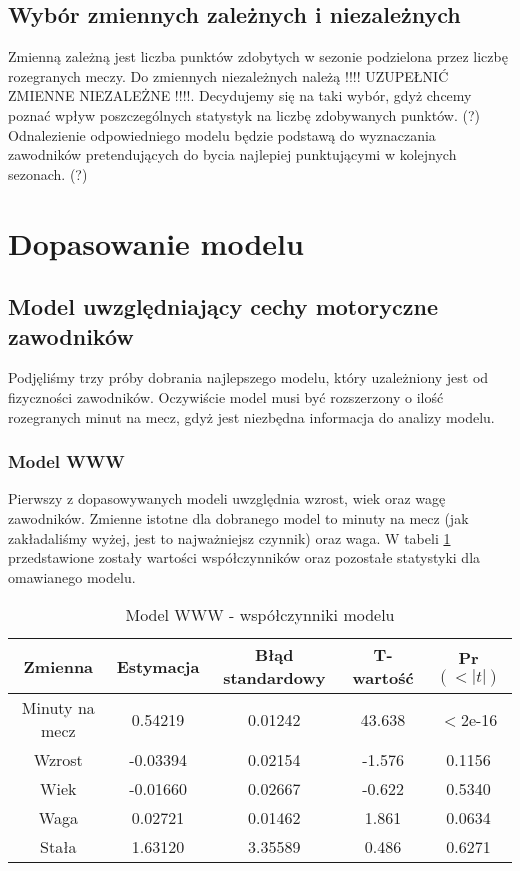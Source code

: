 \documentclass[11pt,a4paper]{article}
\begin{document}
\subsection{Wybór zmiennych zależnych i niezależnych}
	Zmienną zależną jest liczba punktów zdobytych w sezonie podzielona przez liczbę rozegranych meczy. Do zmiennych niezależnych należą !!!! UZUPEŁNIĆ ZMIENNE NIEZALEŻNE !!!!. Decydujemy się na taki wybór, gdyż chcemy poznać wpływ poszczególnych statystyk na liczbę zdobywanych punktów. (?) Odnalezienie odpowiedniego modelu będzie podstawą do wyznaczania zawodników pretendujących do bycia najlepiej punktującymi w kolejnych sezonach. (?)
	
\section{Dopasowanie modelu}
\subsection{Model uwzględniający cechy motoryczne zawodników}
Podjęliśmy trzy próby dobrania najlepszego modelu, który uzależniony jest od fizyczności zawodników. Oczywiście model musi być rozszerzony o ilość rozegranych minut na mecz, gdyż jest niezbędna informacja do analizy modelu.

\subsubsection{Model WWW}
Pierwszy z dopasowywanych modeli uwzględnia wzrost, wiek oraz wagę zawodników. Zmienne istotne dla dobranego model to minuty na mecz (jak zakładaliśmy wyżej, jest to najważniejsz czynnik) oraz waga. W tabeli \ref{model_www} przedstawione zostały wartości współczynników oraz pozostałe statystyki dla omawianego modelu. 

\begin{table}[H]
	\begin{tabular}{| c | c | c | c | c |}
		\hline
		Zmienna & Estymacja & Błąd standardowy & T-wartość & Pr$(<|t|)$\\ \hline
		Minuty na mecz & 0.54219 & 0.01242 & 43.638 & $<$2e-16\\ \hline
		Wzrost & -0.03394 & 0.02154 & -1.576 & 0.1156\\ \hline
		Wiek & -0.01660 & 0.02667 & -0.622 & 0.5340\\ \hline 
		Waga & 0.02721 & 0.01462 & 1.861 & 0.0634\\ \hline
		Stała & 1.63120 & 3.35589 & 0.486 & 0.6271 \\ \hline
	\end{tabular}
\caption{Model WWW - współczynniki modelu}
\label{model_www}
\end{table}
	
\end{document}
